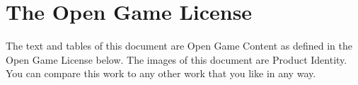 \chapter{The Open Game License}
\label{Open Game License}

The text and tables of this document are Open Game Content as defined in the Open Game License below. The images of this document are Product Identity. You can compare this work to any other work that you like in any way.



